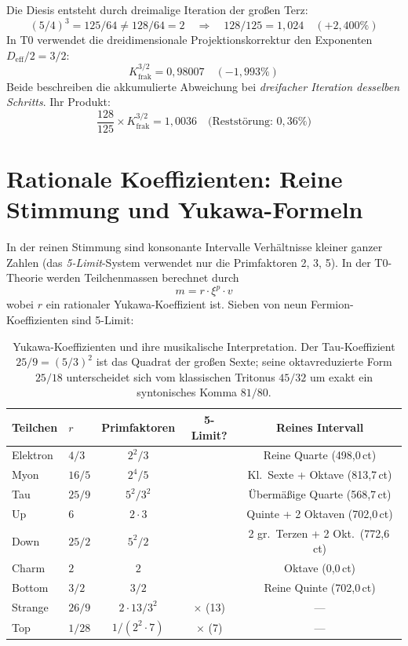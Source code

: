 Die Diesis entsteht durch dreimalige Iteration der großen Terz:
\begin{equation}
	(5/4)^3 = 125/64 \neq 128/64 = 2 \quad \Rightarrow \quad 128/125 = 1{,}024 \quad (+2{,}400\%)
\end{equation}
In T0 verwendet die dreidimensionale Projektionskorrektur den Exponenten $D_\text{eff}/2 = 3/2$:
\begin{equation}
	K_\text{frak}^{3/2} = 0{,}98007 \quad (-1{,}993\%)
\end{equation}
Beide beschreiben die akkumulierte Abweichung bei \emph{dreifacher Iteration desselben Schritts}. Ihr Produkt:
\begin{equation}
	\frac{128}{125} \times K_\text{frak}^{3/2} = 1{,}0036 \quad \text{(Reststörung: } 0{,}36\%\text{)}
\end{equation}

\section{Rationale Koeffizienten: Reine Stimmung und Yukawa-Formeln}

In der reinen Stimmung sind konsonante Intervalle Verhältnisse kleiner ganzer Zahlen (das \emph{5-Limit}-System verwendet nur die Primfaktoren 2, 3, 5). In der T0-Theorie werden Teilchenmassen berechnet durch
\begin{equation}
	m = r \cdot \xi^p \cdot v
\end{equation}
wobei $r$ ein rationaler Yukawa-Koeffizient ist. Sieben von neun Fermion-Koeffizienten sind 5-Limit:

\begin{table}[h]
\centering
\begin{tabular}{llccc}
	\toprule
	Teilchen & $r$ & Primfaktoren & 5-Limit? & Reines Intervall\\
	\midrule
	Elektron & $4/3$ & $2^2/3$ & \checkmark & Reine Quarte (498{,}0\,ct)\\
	Myon & $16/5$ & $2^4/5$ & \checkmark & Kl.\ Sexte + Oktave (813{,}7\,ct)\\
	Tau & $25/9$ & $5^2/3^2$ & \checkmark & Übermäßige Quarte (568{,}7\,ct)\\
	Up & $6$ & $2 \cdot 3$ & \checkmark & Quinte + 2 Oktaven (702{,}0\,ct)\\
	Down & $25/2$ & $5^2/2$ & \checkmark & 2 gr.\ Terzen + 2 Okt.\ (772{,}6\,ct)\\
	Charm & $2$ & $2$ & \checkmark & Oktave (0{,}0\,ct)\\
	Bottom & $3/2$ & $3/2$ & \checkmark & Reine Quinte (702{,}0\,ct)\\
	\midrule
	Strange & $26/9$ & $2 \cdot 13/3^2$ & $\times$ (13) & ---\\
	Top & $1/28$ & $1/(2^2 \cdot 7)$ & $\times$ (7) & ---\\
	\bottomrule
\end{tabular}
\caption{Yukawa-Koeffizienten und ihre musikalische Interpretation. Der Tau-Koeffizient $25/9 = (5/3)^2$ ist das Quadrat der großen Sexte; seine oktavreduzierte Form $25/18$ unterscheidet sich vom klassischen Tritonus $45/32$ um exakt ein syntonisches Komma $81/80$.}
\label{tab:yukawa-musik}
\end{table}

